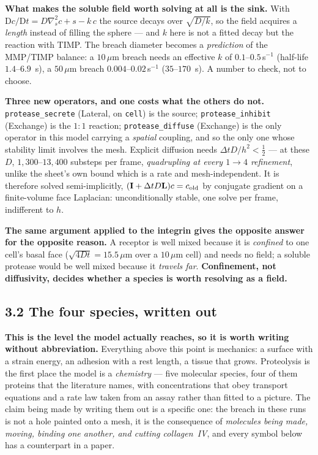 \documentclass[10pt,a4paper]{article}
\newcommand{\code}[1]{\texttt{#1}}
\newcommand{\op}[1]{\texttt{#1}}
\begin{document}
\textbf{What makes the soluble field worth solving at all is the sink.} With
$\mathrm Dc/\mathrm Dt = D\nabla_s^2c + s - k\,c$ the source decays over $\sqrt{D/k}$, so the field
acquires a \emph{length} instead of filling the sphere --- and $k$ here is not a fitted decay but the
reaction with TIMP. The breach diameter becomes a \emph{prediction} of the MMP/TIMP balance: a
$10\,\mu$m breach needs an effective $k$ of $0.1$--$0.5\,$s$^{-1}$ (half-life $1.4$--$6.9$~s), a
$50\,\mu$m breach $0.004$--$0.02\,$s$^{-1}$ ($35$--$170$~s). A number to check, not to choose.

\textbf{Three new operators, and one costs what the others do not.} \op{protease\_secrete} (Lateral, on
\code{cell}) is the source; \op{protease\_inhibit} (Exchange) is the $1{:}1$ reaction;
\op{protease\_diffuse} (Exchange) is the only operator in this model carrying a \emph{spatial}
coupling, and so the only one whose stability limit involves the mesh. Explicit diffusion needs
$\Delta t D/h^2<\tfrac12$ --- at these $D$, $1{,}300$--$13{,}400$ substeps per frame, \emph{quadrupling
at every $1\!\to\!4$ refinement}, unlike the sheet's own bound which is a rate and mesh-independent. It
is therefore solved semi-implicitly, $(\mathbf I+\Delta t D\mathbf L)c=c_{\rm old}$ by conjugate
gradient on a finite-volume face Laplacian: unconditionally stable, one solve per frame, indifferent
to $h$.

\textbf{The same argument applied to the integrin gives the opposite answer for the opposite reason.}
A receptor is well mixed because it is \emph{confined} to one cell's basal face ($\sqrt{4Dt}=15.5\,\mu$m
over a $10\,\mu$m cell) and needs no field; a soluble protease would be well mixed because it
\emph{travels far}. \textbf{Confinement, not diffusivity, decides whether a species is worth resolving
as a field.}



\subsection*{3.2\; The four species, written out}

\textbf{This is the level the model actually reaches, so it is worth writing without abbreviation.}
Everything above this point is mechanics: a surface with a strain energy, an adhesion with a rest
length, a tissue that grows. Proteolysis is the first place the model is a \emph{chemistry} --- five
molecular species, four of them proteins that the literature names, with concentrations that obey
transport equations and a rate law taken from an assay rather than fitted to a picture. The claim
being made by writing them out is a specific one: the breach in these runs is not a hole painted onto
a mesh, it is the consequence of \emph{molecules being made, moving, binding one another, and cutting
collagen~IV}, and every symbol below has a counterpart in a paper.
\end{document}
